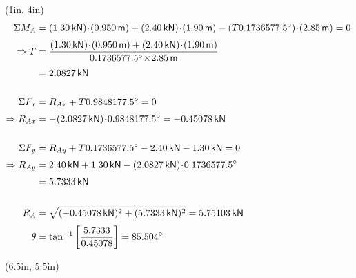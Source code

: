 \documentclass[10pt,oneside]{article}
\begin{document}
  \begin{textblock*}{\textwidth}(1in, 4in)
    \begin{align*}
      \Sigma M_A &= (1.30\,\mathsf{kN})\cd (0.950\,\mathsf{m}) + (2.40\,\mathsf{kN})\cd (1.90\,\mathsf{m}) - (T\sin 77.5\deg)\cd (2.85\,\mathsf{m}) = 0 \\[0.25em]
      \Ra T &= \frac{(1.30\,\mathsf{kN})\cd (0.950\,\mathsf{m}) + (2.40\,\mathsf{kN})\cd (1.90\,\mathsf{m})}{\sin 77.5\deg \x 2.85\,\mathsf{m}} \\[0.25em]
      &= 2.0827\,\mathsf{kN} \\\\
      \Sigma F_x &= R_{Ax}+T\cos 77.5\deg = 0  \\[0.25em]
      \Ra R_{Ax} &= -(2.0827\,\mathsf{kN})\cd\cos 77.5\deg = -0.45078\,\mathsf{kN} \\\\
      \Sigma F_y &= R_{Ay} + T\sin 77.5\deg - 2.40\,\mathsf{kN} - 1.30\,\mathsf{kN} = 0 \\[0.25em]
      \Ra R_{Ay} &= 2.40\,\mathsf{kN} +1.30\,\mathsf{kN} - (2.0827\,\mathsf{kN})\cd\sin 77.5\deg \\[0.25em]
      &= 5.7333\,\mathsf{kN} \\\\
      R_A &= \sqrt{(-0.45078\,\mathsf{kN})^2+(5.7333\,\mathsf{kN})^2} = 5.75103\,\mathsf{kN} \\[0.25em]
      \theta &= \tan ^{-1}\left[\frac{5.7333}{0.45078}\right] = 85.504\deg
    \end{align*}
    \parb\large
     
  \end{textblock*}

  \begin{textblock*}{2in}(6.5in, 5.5in)

   
  \end{textblock*}
\end{document}
